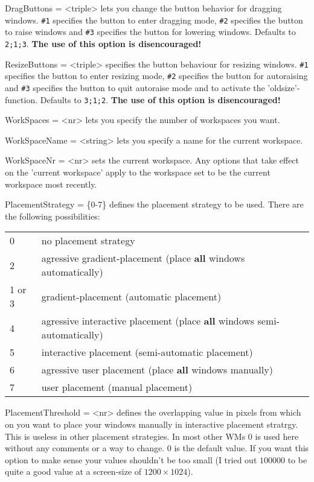 \documentclass[10pt,a4paper]{article}
\newenvironment{ttdesc}[1]{
   \begin{list}{}{
          \renewcommand{\makelabel}[1]{\texttt{##1\hfill}}}}{\end{list}}
\begin{document}
\begin{ttdesc}{description}
\item[DragButtons = <triple>] lets you change the button behavior for dragging windows. \texttt{\#1} specifies the button to enter dragging mode, \texttt{\#2} specifies the button to raise windows and \texttt{\#3} specifies the button for lowering windows. Defaults to \texttt{2;1;3}. \textbf{The use of this option is disencouraged!}

\item[ResizeButtons = <triple>] specifies the button behaviour for resizing windows. \texttt{\#1} specifies the button to enter resizing mode, \texttt{\#2} specifies the button for autoraising and \texttt{\#3} specifies the button to quit autoraise mode and to activate the 'oldsize'-function. Defaults to \texttt{3;1;2}. \textbf{The use of this option is disencouraged!}

\item[WorkSpaces = <nr>] lets you specify the number of workspaces you want.

\item[WorkSpaceName = <string>] lets you specify a name for the current workspace.

\item[WorkSpaceNr = <nr>] sets the current workspace. Any options that take effect on the 'current workspace' apply to the workspace set to be the current workspace most recently.

\item[PlacementStrategy = \{0-7\}] defines the placement strategy to be used. There are the following possibilities:\\
\begin{tabular}{ll}
0 & no placement strategy\\
2 & agressive gradient-placement (place \textbf{all} windows automatically)\\
1 or 3 \dotfill& gradient-placement (automatic placement)\\
4 & agressive interactive placement (place \textbf{all} windows semi-automatically) \\
5 & interactive placement (semi-automatic placement)\\
6 & agressive user placement (place \textbf{all} windows manually)\\
7 & user placement (manual placement)
\end{tabular}

\item[PlacementThreshold = <nr>] defines the overlapping value in pixels from which on you want to place your windows manually in interactive placement stratrgy. This is useless in other placement strategies. In most other WMs $0$ is used here without any comments or a way to change. $0$ is the default value. If you want this option to make sense your values shouldn't be too small (I tried out $100000$ to be quite a good value at a screen-size of $1200\times1024$).


\end{ttdesc}
\end{document}
